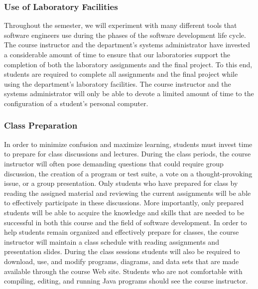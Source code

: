 \subsubsection*{Use of Laboratory Facilities}

Throughout the semester, we will experiment with many different tools that software engineers use during the phases of
the software development life cycle.  The course instructor and the department's systems administrator have invested a
considerable amount of time to ensure that our laboratories support the completion of both the laboratory assignments and the
final project.  To this end, students are required to complete all assignments and the final project while using the
department's laboratory facilities. The course instructor and the systems administrator will only be able to devote a
limited amount of time to the configuration of a student's personal computer.

\subsubsection*{Class Preparation}

% 

In order to minimize confusion and maximize learning, students must invest time to prepare for class discussions and
lectures.  During the class periods, the course instructor will often pose demanding questions that could require group
discussion, the creation of a program or test suite, a vote on a thought-provoking issue, or a group presentation.
Only students who have prepared for class by reading the assigned material and reviewing the current assignments will be
able to effectively participate in these discussions.  More importantly, only prepared students will be able to acquire
the knowledge and skills that are needed to be successful in both this course and the field of software development.  In
order to help students remain organized and effectively prepare for classes, the course instructor will maintain a class
schedule with reading assignments and presentation slides.   During the class sessions students will also be required to
download, use, and modify programs, diagrams, and data sets that are made available through the course Web site.
Students who are not comfortable with compiling, editing, and running Java programs should see the course instructor.

